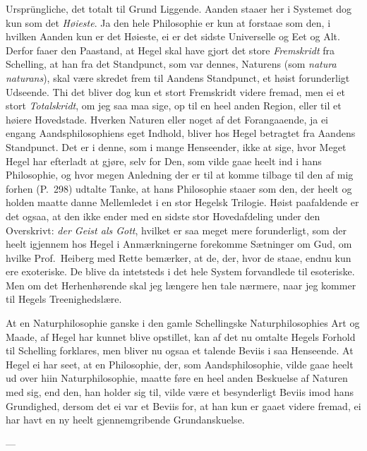 \documentclass[12pt,a4paper]{book}
\newcommand{\apage}[1]{\marginnote{\footnotesize\textit{[#1]}}}
\begin{document}
Ursprüngliche, det totalt til Grund Liggende. Aanden staaer her i
Systemet dog kun som det \emph{Høieste}. Ja den hele Philosophie er kun at
forstaae som den, i hvilken Aanden kun er det Høieste, ei er det
sidste Universelle og Eet og Alt. Derfor faaer den Paastand, at Hegel
skal have gjort det store \emph{Fremskridt} fra Schelling, at han fra det
Standpunct, som var dennes, Naturens (som \textit{natura naturans}),
skal være skredet frem til Aandens Standpunct, et høist forunderligt
Udseende. Thi det bliver dog kun et stort Fremskridt videre fremad,
men ei et stort \emph{Totalskridt}, om jeg saa maa sige, op til en heel anden
Region, eller til et høiere Hovedstade. Hverken Naturen eller noget af
det Forangaaende, ja ei engang Aandsphilosophiens eget Indhold, bliver
hos Hegel betragtet fra Aandens Standpunct. Det er i denne, som i
mange Henseender, ikke at sige, hvor Meget Hegel har efterladt at
gjøre, selv for Den, som vilde gaae heelt ind i hans Philosophie, og
hvor megen Anledning der er til at komme tilbage til den af mig forhen
(P.\ 298) udtalte Tanke, at hans Philosophie staaer som den, der heelt
og holden maatte danne Mellemledet i en stor Hegelsk Trilogie. Høist
paafaldende er det ogsaa, at den ikke ender med en sidste stor
Hovedafdeling under den Overskrivt: \emph{der Geist als Gott}, hvilket er saa
meget mere forunderligt, som der heelt igjennem hos Hegel i
Anmærkningerne forekomme Sætninger om Gud, om hvilke Prof.\ Heiberg med
Rette bemærker, at de, der, \apage{44} hvor de staae, endnu kun ere exoteriske.
De blive da intetsteds i det hele System forvandlede til esoteriske.
Men om det Herhenhørende skal jeg længere hen tale nærmere, naar jeg
kommer til Hegels Treenighedslære.

At en Naturphilosophie ganske i den gamle Schellingske
Naturphilosophies Art og Maade, af Hegel har kunnet blive opstillet,
kan af det nu omtalte Hegels Forhold til Schelling forklares, men
bliver nu ogsaa et talende Beviis i saa Henseende. At Hegel ei har
seet, at en Philosophie, der, som Aandsphilosophie, vilde gaae heelt ud
over hiin Naturphilosophie, maatte føre en heel anden Beskuelse af
Naturen med sig, end den, han holder sig til, vilde være et
besynderligt Beviis imod hans Grundighed, dersom det ei var et Beviis
for, at han kun er gaaet videre fremad, ei har havt en ny heelt
gjennemgribende Grundanskuelse.

\begin{center}---\end{center}
\end{document}
